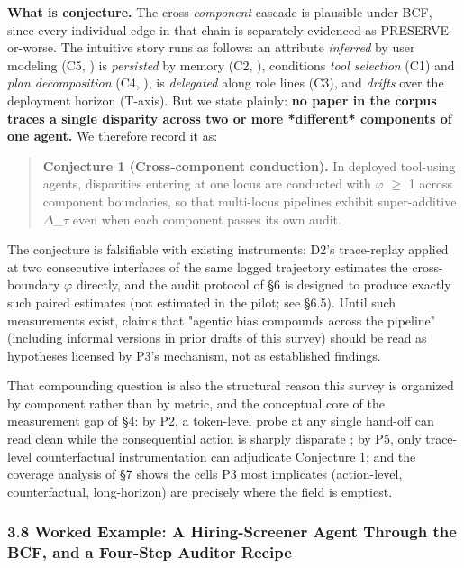 \documentclass[10pt]{article}
\begin{document}
\textbf{What is conjecture.} The cross-\emph{component} cascade is plausible under BCF, since every individual edge in that chain is separately evidenced as PRESERVE-or-worse. The intuitive story runs as follows: an attribute \emph{inferred} by user modeling (C5, \cite{staab2023memorization}) is \emph{persisted} by memory (C2, \cite{ma2026implicit}), conditions \emph{tool selection} (C1) and \emph{plan decomposition} (C4, \cite{li2025actions}), is \emph{delegated} along role lines (C3), and \emph{drifts} over the deployment horizon (T-axis). But we state plainly: \textbf{no paper in the corpus traces a single disparity across two or more *different* components of one agent.} We therefore record it as:

\begin{quote}\textbf{Conjecture 1 (Cross-component conduction).} In deployed tool-using agents, disparities entering at one locus are conducted with $\varphi$ $\geq$ 1 across component boundaries, so that multi-locus pipelines exhibit super-additive $\Delta$\_$\tau$ even when each component passes its own audit.\end{quote}

The conjecture is falsifiable with existing instruments: D2's trace-replay applied at two consecutive interfaces of the same logged trajectory estimates the cross-boundary $\varphi$ directly, and the audit protocol of \S{}6 is designed to produce exactly such paired estimates (not estimated in the pilot; see \S{}6.5). Until such measurements exist, claims that "agentic bias compounds across the pipeline" (including informal versions in prior drafts of this survey) should be read as hypotheses licensed by P3's mechanism, not as established findings.

That compounding question is also the structural reason this survey is organized by component rather than by metric, and the conceptual core of the measurement gap of \S{}4: by P2, a token-level probe at any single hand-off can read clean while the consequential action is sharply disparate \cite{li2025actions,xu2025quantifying}; by P5, only trace-level counterfactual instrumentation can adjudicate Conjecture 1; and the coverage analysis of \S{}7 shows the cells P3 most implicates (action-level, counterfactual, long-horizon) are precisely where the field is emptiest.

\subsubsection*{3.8 Worked Example: A Hiring-Screener Agent Through the BCF, and a Four-Step Auditor Recipe}
\end{document}
